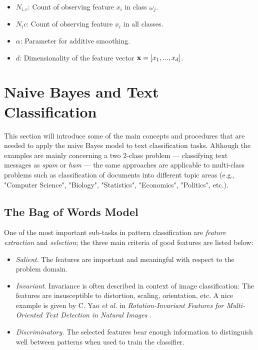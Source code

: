 \documentclass{article}
\begin{document}
\begin{itemize}

\item $N_{i,c}$: Count of observing feature $x_i$ in class $\omega_j$.
\item $N_ic$: Count of observing feature $x_i$ in all classes.
\item $\alpha$: Parameter for additive smoothing. 
\item $d$: Dimensionality of the feature vector $\textbf x = [x_1, ..., x_d]$.

\end{itemize}



 \section{Naive Bayes and Text Classification}

This section will introduce some of the main concepts and procedures that are needed to apply the naive Bayes model to text classification tasks. Although the examples are mainly concerning a two 2-class problem --- classifying text messages as \emph{spam} or \emph{ham} --- the same approaches are applicable to multi-class problems such as classification of documents into different topic areas (e.g., "Computer Science", "Biology", "Statistics", "Economics", "Politics", etc.).

\subsection{The Bag of Words Model}
\label{sec:the_bag_of_words_model}

One of the most important sub-tasks in pattern classification are \emph{feature extraction} and \emph{selection}; the three main criteria of good features are listed below:

\begin{itemize}
	\item \emph{Salient}. The features are important and meaningful with respect to the problem domain.
	\item \emph{Invariant}. Invariance is often described in context of image classification: The features are insusceptible to distortion, scaling, orientation, etc. A nice example is given by C. Yao \emph{et al.} in \emph{Rotation-Invariant Features for Multi-Oriented Text Detection in Natural Images} \cite{yao2013rotation}.
	\item \emph{Discriminatory.} The selected features bear enough information to distinguish well between patterns when used to train the classifier.
\end{itemize}
\end{document}
